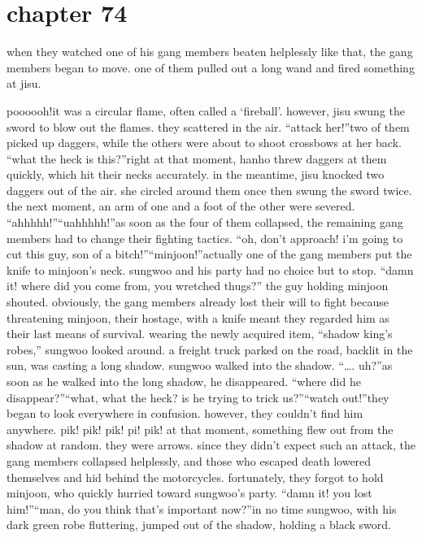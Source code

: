 \section{chapter 74}

                            when they watched one of his gang members beaten helplessly like that, the gang members began to move.
 one of them pulled out a long wand and fired something at jisu.





poooooh!it was a circular flame, often called a ‘fireball’.
however, jisu swung the sword to blow out the flames.
 they scattered in the air.
“attack her!”two of them picked up daggers, while the others were about to shoot crossbows at her back.
“what the heck is this?”right at that moment, hanho threw daggers at them quickly, which hit their necks accurately.
in the meantime, jisu knocked two daggers out of the air.
 she circled around them once then swung the sword twice.
 the next moment, an arm of one and a foot of the other were severed.
“ahhhhh!”“uahhhhh!”as soon as the four of them collapsed, the remaining gang members had to change their fighting tactics.
“oh, don’t approach! i’m going to cut this guy, son of a bitch!”“minjoon!”actually one of the gang members put the knife to minjoon’s neck.
 sungwoo and his party had no choice but to stop.
“damn it! where did you come from, you wretched thugs?” the guy holding minjoon shouted.
obviously, the gang members already lost their will to fight because threatening minjoon, their hostage, with a knife meant they regarded him as their last means of survival.
wearing the newly acquired item, “shadow king’s robes,” sungwoo looked around.
 a freight truck parked on the road, backlit in the sun, was casting a long shadow.
sungwoo walked into the shadow.
“….
uh?”as soon as he walked into the long shadow, he disappeared.
“where did he disappear?”“what, what the heck? is he trying to trick us?”“watch out!”they began to look everywhere in confusion.
 however, they couldn’t find him anywhere.
pik! pik! pik! pi! pik!
at that moment, something flew out from the shadow at random.
 they were arrows.
since they didn’t expect such an attack, the gang members collapsed helplessly, and those who escaped death lowered themselves and hid behind the motorcycles.
fortunately, they forgot to hold minjoon, who quickly hurried toward sungwoo’s party.
“damn it! you lost him!”“man, do you think that’s important now?”in no time sungwoo, with his dark green robe fluttering, jumped out of the shadow, holding a black sword.
